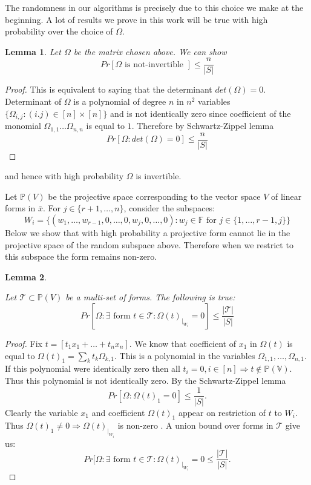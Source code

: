 \documentclass[12pt]{caltech_thesis}
\theoremstyle{plain}
\newtheorem{lemma}{Lemma}
\theoremstyle{definition}
\newcommand{\F}{\mathbb{F}}
\newcommand{\MT}{\mathcal{T}}
\newcommand{\PP}{\mathbb{P}}
\newcommand{\V}{\mathbb{V}}
\newcommand{\B}[1]{\bar{#1}}
\begin{document}
The randomness in our algorithms is precisely due to this choice we make at the beginning. A lot of results we prove in this work will be true with
high probability over the choice of $\Omega$. 

\begin{lemma}\label{lemma:matrixinvertible}
 Let $\Omega$ be the matrix chosen above. We can show
 \[
  Pr[\Omega \text{ is not-invertible }] \leq \frac{n}{|S|}
 \]
\end{lemma}
\begin{proof}
 This is equivalent to saying that the determinant $det(\Omega) = 0$. Determinant of $\Omega$ is a polynomial of degree $n$ in $n^2$ variables
 $\{\Omega_{i,j} : (i.j)\in [n]\times[n]\}$
 and is not identically zero since coefficient of the monomial $\Omega_{1,1}\ldots\Omega_{n,n}$ is equal to $1$. Therefore by Schwartz-Zippel lemma
 \[
  Pr[\Omega : det(\Omega) = 0] \leq \frac{n}{|S|}
 \]
\end{proof}
and hence with high probability $\Omega$ is invertible. 

Let $\PP(V)$ be the projective space corresponding to the vector space $V$ of linear forms in $\B{x}$. For $j\in \{r+1,\ldots,n\}$, consider the subspaces:
\[
W_i = \{(w_1,\ldots,w_{r-1},0,\ldots,0,w_j,0,\ldots,0) : w_j\in \F \text{ for }j\in \{1,\ldots,r-1,j\}\}
\]
Below we show that with high probability a projective form cannot lie in the projective space of the random subspace above. Therefore 
when we restrict to this subspace the form remains non-zero. 

\begin{lemma}\label{lemma:nonzero}

 Let $\MT \subset \PP(V)$ be a multi-set of forms. The following is true:
 \[
  Pr[\Omega :  \exists \text{ form } t  \in \MT : \Omega(t)_{|_{W_i}} =0] \leq\frac{|\MT|}{|S|}
 \]
\end{lemma}
\begin{proof}
 Fix $t = [t_1x_1+\ldots+t_nx_n]$.  
 We know that coefficient of $x_1$ in  $\Omega(t)$ is equal to $\Omega(t)_1 = \sum\limits_{k}t_k\Omega_{k,1}$. This is a polynomial in the variables
 $\Omega_{1,1},\ldots , \Omega_{n,1}$. If this polynomial were identically zero then all $t_i=0, i\in [n] \Rightarrow t \notin \PP(\V)$. Thus
 this polynomial is not identically zero. By the Schwartz-Zippel lemma
 \[
  Pr[\Omega : \Omega(t)_1 = 0 ]\leq \frac{1}{|S|}.
 \]
Clearly the variable $x_1$ and coefficient $\Omega(t)_{1}$ appear on restriction of $t$ to $W_i$. Thus $\Omega(t)_1\neq 0\Rightarrow \Omega(t)_{|_{W_i}}$
is non-zero  . A union bound over forms in $\MT$ give us:
\[
  Pr[\Omega :  \exists \text{ form } t  \in \MT : \Omega(t)_{|_{W_i}}=0  \leq\frac{|\MT|}{|S|}.
\]
 \end{proof}
\end{document}
